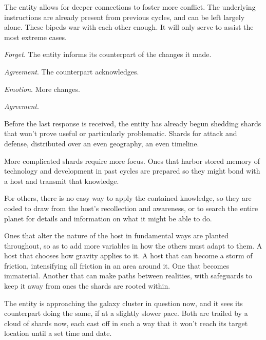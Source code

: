 The entity allows for deeper connections to foster more conflict.  The underlying instructions are already present from previous cycles, and can be left largely alone.  These bipeds war with each other enough.  It will only serve to assist the most extreme cases.



\emph{Forget}.  The entity informs its counterpart of the changes it made.



\emph{Agreement}.  The counterpart acknowledges.



\emph{Emotion}.  More changes.



\emph{Agreement}.



Before the last response is received, the entity has already begun shedding shards that won't prove useful or particularly problematic.  Shards for attack and defense, distributed over an even geography, an even timeline.



More complicated shards require more focus.  Ones that harbor stored memory of technology and development in past cycles are prepared so they might bond with a host and transmit that knowledge.



For others, there is no easy way to apply the contained knowledge, so they are coded to draw from the host's recollection and awareness, or to search the entire planet for details and information on what it might be able to do.



Ones that alter the nature of the host in fundamental ways are planted throughout, so as to add more variables in how the others must adapt to them.  A host that chooses how gravity applies to it.  A host that can become a storm of friction, intensifying all friction in an area around it.  One that becomes immaterial.  Another that can make paths between realities, with safeguards to keep it away from ones the shards are rooted within.



The entity is approaching the galaxy cluster in question now, and it sees its counterpart doing the same, if at a slightly slower pace.  Both are trailed by a cloud of shards now, each cast off in such a way that it won't reach its target location until a set time and date.



